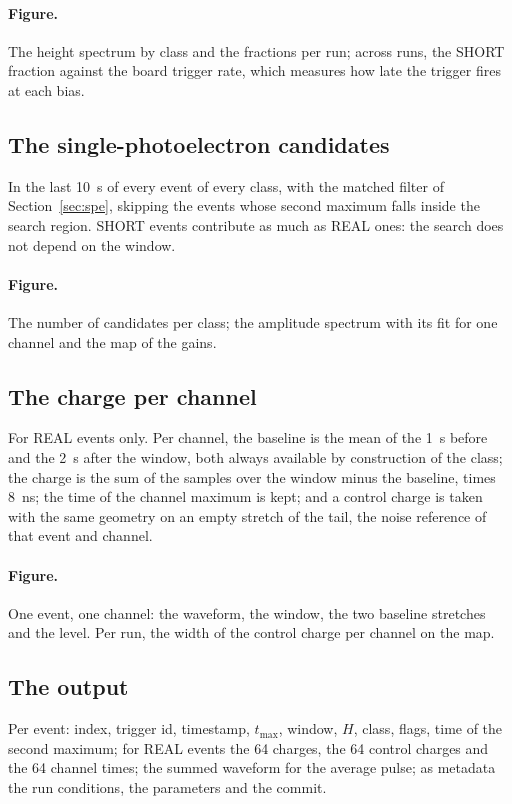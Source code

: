 \documentclass[11pt]{article}
\newcommand{\us}{\textmu s\xspace}
\begin{document}
\paragraph{Figure.} The height spectrum by class and the fractions per
run; across runs, the SHORT fraction against the board trigger rate,
which measures how late the trigger fires at each bias.

\subsection{The single-photoelectron candidates}

In the last 10~\us of every event of every class, with the matched
filter of Section~\ref{sec:spe}, skipping the events whose second
maximum falls inside the search region. SHORT events contribute as
much as REAL ones: the search does not depend on the window.

\paragraph{Figure.} The number of candidates per class; the amplitude
spectrum with its fit for one channel and the map of the gains.

\subsection{The charge per channel}

For REAL events only. Per channel, the baseline is the mean of the 1~\us
before and the 2~\us after the window, both always available by
construction of the class; the charge is the sum of the samples over
the window minus the baseline, times 8~ns; the time of the channel
maximum is kept; and a control charge is taken with the same geometry on
an empty stretch of the tail, the noise reference of that event and
channel.

\paragraph{Figure.} One event, one channel: the waveform, the window,
the two baseline stretches and the level. Per run, the width of the
control charge per channel on the map.

\subsection{The output}

Per event: index, trigger id, timestamp, $t_{\max}$, window, $H$, class,
flags, time of the second maximum; for REAL events the 64 charges, the
64 control charges and the 64 channel times; the summed waveform for the
average pulse; as metadata the run conditions, the parameters and the
commit.
\end{document}
